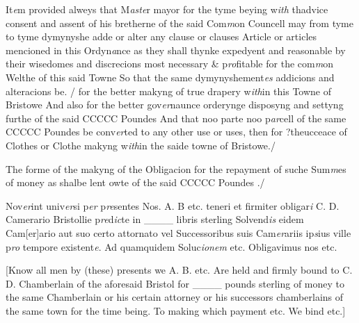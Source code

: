 \documentclass[a4paper,12pt]{article}
\begin{document}
It\textit{e}m provided alweys that M\textit{aste}r mayor for the tyme beying w\textit{ith} thadvice consent and assent of his bretherne of the said Com\textit{m}on Councell may from tyme to tyme dymynyshe adde or alter any clause or clauses Article or articles mencioned in this Ordyn\textit{a}nce as they shall thynke expedyent and reasonable by their wisedomes and discrecions most necessary \& p\textit{ro}fitable for the com\textit{m}on Welthe of this said Towne So that the same dymynyshement\textit{es} addicions and alteracions be. / for the better makyng of true drapery w\textit{ith}in this Towne of Bristowe And also for the better gov\textit{er}naunce orderynge disposyng and settyng furthe of the said CCCCC Poundes And that noo parte noo p\textit{ar}cell of the same CCCCC Poundes be conv\textit{er}ted to any other use or uses, then for ?theucceace of Clothes or Clothe makyng w\textit{ith}in the saide towne of Bristowe./

The forme of the makyng of the Obligacion for the repayment of suche Sum\textit{m}es of money as shalbe lent owte of the said CCCCC Poundes ./

\begin{sloppypar}Nov\textit{er}int univ\textit{er}si p\textit{er} p\textit{re}sentes Nos. A. B etc. teneri et firmiter obligar\textit{i} C. D. Camerario Bristollie p\textit{re}d\textit{ic}te in \_\_\_\_ libris sterling Solvend\textit{is} eidem Cam[er]ario aut suo certo attornato vel Successoribus suis Cam\textit{er}ariis ip\textit{s}ius ville p\textit{ro} tempore existent\textit{e}. Ad quamquidem Soluc\textit{ionem} etc. Obligavimus nos etc.\end{sloppypar}

[Know all men by (these) presents we A. B. etc. Are held and firmly bound to C. D. Chamberlain of the aforesaid Bristol for \_\_\_\_ pounds sterling of money to the same Chamberlain or his certain attorney or his successors chamberlains of the same town for the time being. To making which payment etc. We bind etc.]
\end{document}
